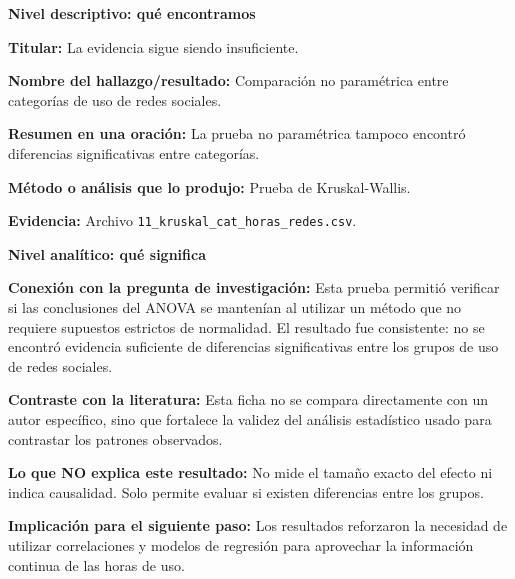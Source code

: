 \documentclass[12pt]{article}
\begin{document}
\begin{tcolorbox}[
colback=blue!5,
colframe=blue!75!black,
title=Ficha 3. Kruskal-Wallis: respaldo no paramétrico]

\textbf{Nivel descriptivo: qué encontramos}

\textbf{Titular:} La evidencia sigue siendo insuficiente.

\textbf{Nombre del hallazgo/resultado:} Comparación no paramétrica entre categorías de uso de redes sociales.

\textbf{Resumen en una oración:} La prueba no paramétrica tampoco encontró diferencias significativas entre categorías.

\textbf{Método o análisis que lo produjo:} Prueba de Kruskal-Wallis.

\textbf{Evidencia:} Archivo \texttt{11\_kruskal\_cat\_horas\_redes.csv}.

\textbf{Nivel analítico: qué significa}

\textbf{Conexión con la pregunta de investigación:} Esta prueba permitió verificar si las conclusiones del ANOVA se mantenían al utilizar un método que no requiere supuestos estrictos de normalidad. El resultado fue consistente: no se encontró evidencia suficiente de diferencias significativas entre los grupos de uso de redes sociales.

\textbf{Contraste con la literatura:} Esta ficha no se compara directamente con un autor específico, sino que fortalece la validez del análisis estadístico usado para contrastar los patrones observados.

\textbf{Lo que NO explica este resultado:} No mide el tamaño exacto del efecto ni indica causalidad. Solo permite evaluar si existen diferencias entre los grupos.

\textbf{Implicación para el siguiente paso:} Los resultados reforzaron la necesidad de utilizar correlaciones y modelos de regresión para aprovechar la información continua de las horas de uso.
\end{tcolorbox}
\end{document}
